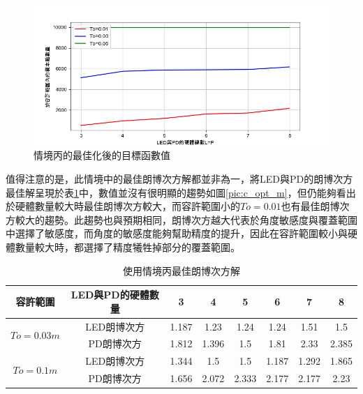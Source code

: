     \begin{figure}[htpb]
        \centering
        \includegraphics[width=15cm]{ch5pic/optimize_C.png}
        \caption{情境丙的最佳化後的目標函數值}
        \label{pic:opt_C_line}
    \end{figure}

    
    值得注意的是，此情境中的最佳朗博次方解都並非為一，將LED與PD的朗博次方最佳解呈現於表\ref{tab:C_opt_m}中，數值並沒有很明顯的趨勢如圖\ref{pic:c_opt_m}，但仍能夠看出於硬體數量較大時最佳朗博次方較大，而容許範圍小的$To=0.01$也有最佳朗博次方較大的趨勢。此趨勢也與預期相同，朗博次方越大代表於角度敏感度與覆蓋範圍中選擇了敏感度，而角度的敏感度能夠幫助精度的提升，因此在容許範圍較小與硬體數量較大時，都選擇了精度犧牲掉部分的覆蓋範圍。

    \begin{table}[htpb]
        \begin{center}
          \caption{使用情境丙最佳朗博次方解}
          \label{tab:C_opt_m}
          \begin{tabular}{c|c||c|c|c|c|c|c} %
            容許範圍&LED與PD的硬體數量& 3&4&5&6&7&8\\
            \hline

            \multirow{2}{*}{$To=0.03m$}&LED朗博次方& 1.187&	1.23&	1.24	&1.24&	1.51	&1.5\\
            &PD朗博次方& 1.812&	1.396	&1.5&	1.81&	2.33	&2.385\\\hline
            
            \multirow{2}{*}{$To=0.1m$}&LED朗博次方&
            1.344&	1.5	&1.5&	1.187	&1.292&	1.865\\
            &PD朗博次方&1.656	&2.072	&2.333&	2.177	&2.177&	2.23
          \end{tabular}
        \end{center}
      \end{table}

